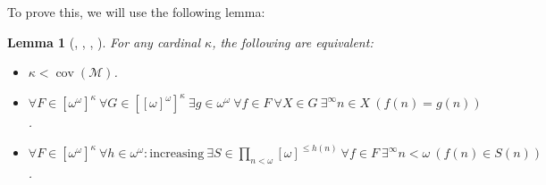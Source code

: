 \documentclass[a4paper,12pt]{amsart}
\newtheorem{lem}[thm]{Lemma}
\theoremstyle{definition}
\numberwithin{thm}{section}
\numberwithin{equation}{section}
\newcommand{\oo}{{\omega}^\omega}
\newcommand{\ooo}{[{\omega}]^\omega}
\DeclareMathOperator{\cov}{cov}
\newcommand{\covm}{\cov(\mathcal{M})}
\begin{document}
    To prove this, we will use the following lemma:

    \begin{lem}[{\cite[Lemma 2.4.2]{BJ95}, \cite{Mil82}, \cite{Bar87}, \cite[Theorem 5.1]{CM23}}]\label{lem:chara_covm}
        For any cardinal $\kappa$, the following are equivalent:
        \begin{itemize}
		      \item $\kappa<\covm$.
		      \item $\forall F\in[\oo]^\kappa~\forall G\in[\ooo]^\kappa~\exists g\in\oo~\forall f\in F~\forall X\in G~\exists^\infty n\in X~(f(n)=g(n))$. \label{item:covm_two}
            \item $\forall F\in[\oo]^\kappa~\forall h\in\omega^\omega: \text{increasing}~\exists S\in\prod_{n<\omega}[\omega]^{\leq h(n)}~\forall f\in F~\exists^\infty n<\omega~(f(n)\in S(n))$. \label{item:covm_three}
        \end{itemize}
    \end{lem}
\end{document}

